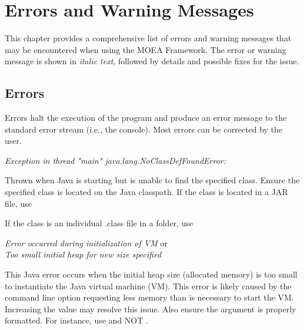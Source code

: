 \chapter{Errors and Warning Messages}

This chapter provides a comprehensive list of errors and warning messages that may be encountered when using the MOEA Framework.  The error or warning message is shown in \textit{italic text}, followed by details and possible fixes for the issue.

\section{Errors}
Errors halt the execution of the program and produce an error message to the standard error stream (i.e., the console).  Most errors can be corrected by the user.
\vspace{\baselineskip}

\noindent
\textit{Exception in thread "main" java.lang.NoClassDefFoundError: }
\begin{indented}
  Thrown when Java is starting but is unable to find the specified class.  Ensure the specified class is located on the Java classpath.  If the class is located in a JAR file, use
  \begin{indented}
  \end{indented}
  If the class is an individual .class file in a folder, use
  \begin{indented}
  \end{indented}
\end{indented}

\noindent
\textit{Error occurred during initialization of VM} or\\
\textit{Too small initial heap for new size specified}
\begin{indented}
  This Java error occurs when the initial heap size (allocated memory) is too small to instantiate the Java virtual machine (VM).  This error is likely caused by the  command line option requesting less memory than is necessary to start the VM.  Increasing the  value may resolve this issue. Also ensure the  argument is properly formatted.  For instance, use  and NOT .
\end{indented}

